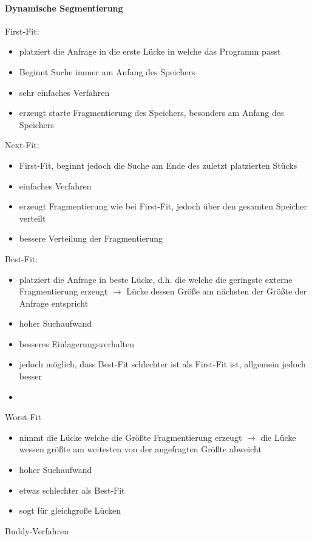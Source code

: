 \documentclass[12pt,a4paper]{article}
\begin{document}
\paragraph{Dynamische Segmentierung}
\flushleft

First-Fit:
\begin{itemize}
\item platziert die Anfrage in die erste Lücke in welche das Programm passt
\item Beginnt Suche immer am Anfang des Speichers
\item sehr einfaches Verfahren
\item erzeugt starte Fragmentierung des Speichers, besonders am Anfang des Speichers
\end{itemize}
Next-Fit:
\begin{itemize}
\item First-Fit, beginnt jedoch die Suche am Ende des zuletzt platzierten Stücks
\item einfaches Verfahren
\item erzeugt Fragmentierung wie bei First-Fit, jedoch über den gesamten Speicher verteilt
\item bessere Verteilung der Fragmentierung
\end{itemize}
Best-Fit:
\begin{itemize}
\item platziert die Anfrage in beste Lücke, d.h. die welche die geringste externe Fragmentierung erzeugt $\rightarrow$ Lücke dessen Größe am nächsten der Größte der Anfrage entspricht
\item hoher Suchaufwand
\item besseres Einlagerungsverhalten
\item jedoch möglich, dass Best-Fit schlechter ist als First-Fit ist, allgemein jedoch besser
\item
\end{itemize}
Worst-Fit
\begin{itemize}
\item nimmt die Lücke welche die Größte Fragmentierung erzeugt $\rightarrow$ die Lücke wessen größte am weitesten von der angefragten Größte abweicht
\item hoher Suchaufwand
\item etwas schlechter als Best-Fit
\item sogt für gleichgroße Lücken
\end{itemize}
Buddy-Verfahren
\end{document}
